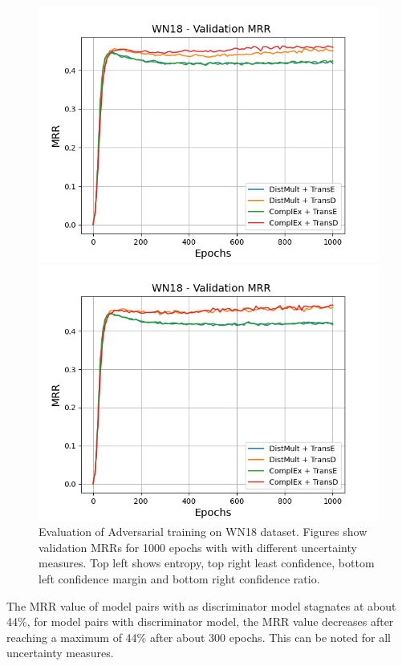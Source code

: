 \begin{figure}[H]
\begin{minipage}{.5\textwidth}
    \end{minipage}
    \begin{minipage}{.5\textwidth}
      \centering
      \includegraphics[width=0.9\linewidth]{figures/results/gan_train/not_pretrained/uncertainty/max_distribution/confidence_margin/wn18/uncertainty_wn18_mrrs.png}
    \end{minipage}%
    \begin{minipage}{.5\textwidth}
      \centering
      \includegraphics[width=0.9\linewidth]{figures/results/gan_train/not_pretrained/uncertainty/max_distribution/confidence_ratio/wn18/uncertainty_wn18_mrrs.png}
    \end{minipage}%
    \caption{Evaluation of Adversarial training on \textsc{WN18} dataset. 
    Figures show validation MRRs for 1000 epochs with \ussoftmax with different uncertainty measures.
    Top left shows entropy, top right least confidence, 
    bottom left confidence margin and bottom right confidence ratio.}
    \label{fig:advtrain_measures_wn18}
\end{figure}
The MRR value of model pairs with \transd as discriminator model stagnates at about 44\%, for model pairs with \transe  discriminator model, the MRR value decreases after reaching a maximum of 44\% after about 300 epochs.
This can be noted for all uncertainty measures.

